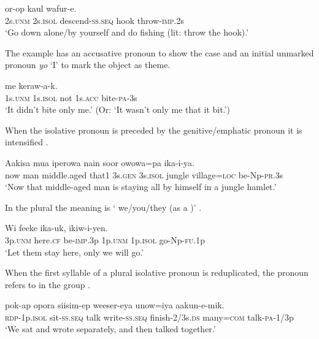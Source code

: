 \ea%
\label{ex:3:x600}
\gll {}  or-op kaul wafur-e. \\
2s.\textsc{unm} 2s.\textsc{isol} descend-\textsc{ss}.\textsc{seq} hook throw-\textsc{imp}.2s\\
\glt`Go down alone/by yourself and do fishing (lit: throw the hook).'
\z

The example  has an accusative pronoun to show the case and an initial unmarked pronoun \textit{yo} `I' to mark the object as theme.

\ea%
\label{ex:3:x601}
\gll {}  me  keraw-a-k. \\
1s.\textsc{unm} 1s.\textsc{isol} not 1s.\textsc{acc} bite-\textsc{pa}-3s\\
\glt`It didn't bite only me.' (Or: `It wasn't only me that it bit.')
\z

When the isolative pronoun is preceded by the genitive/emphatic pronoun it is intensified .

\ea%
\label{ex:3:x1813}
\gll Aakisa mua iperowa nain   soor owowa=pa ika-i-ya.\\
now man middle.aged that1 3s.\textsc{gen} 3s.\textsc{isol} jungle village=\textsc{loc} be-Np-\textsc{pr}.3s\\
\glt`Now that middle-aged man is staying all by himself in a jungle hamlet.'
\z

In the plural the meaning is ` we/you/they (as a )' . 

\ea%
\label{ex:3:x602}
\gll Wi feeke ika-uk,   ikiw-i-yen. \\
3p.\textsc{unm} here.\textsc{cf} be-\textsc{imp}.3p 1p.\textsc{unm} 1p.\textsc{isol} go-Np-\textsc{fu}.1p\\
\glt`Let them stay here, only we will go.'
\z

When the first syllable of a plural isolative pronoun is reduplicated, the pronoun refers to  in the group .

\ea%
\label{ex:3:x603}
\gll {} pok-ap opora siisim-ep weeser-eya unow=iya aakun-e-mik.\\
\textsc{rdp}-1p.\textsc{isol} sit-\textsc{ss}.\textsc{seq} talk write-\textsc{ss}.\textsc{seq} finish-2/3s.\textsc{ds} many=\textsc{com} talk-\textsc{pa}-1/3p\\
\glt`We sat and wrote separately, and then talked together.'
\z

